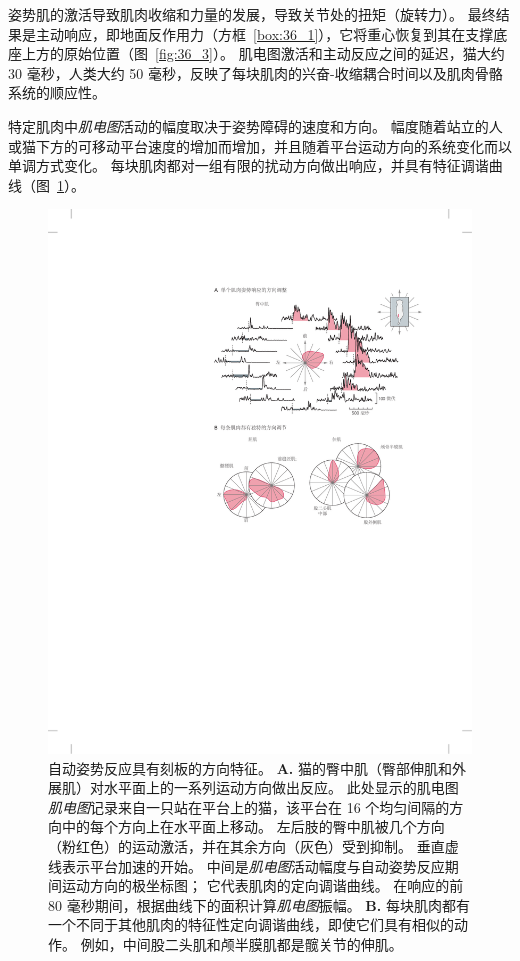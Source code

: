 姿势肌的激活导致肌肉收缩和力量的发展，导致关节处的扭矩（旋转力）。
最终结果是主动响应，即地面反作用力（方框~\ref{box:36_1}），它将重心恢复到其在支撑底座上方的原始位置（图~\ref{fig:36_3}）。
肌电图激活和主动反应之间的延迟，猫大约 30 毫秒，人类大约 50 毫秒，反映了每块肌肉的兴奋-收缩耦合时间以及肌肉骨骼系统的顺应性。


特定肌肉中\textit{肌电图}活动的幅度取决于姿势障碍的速度和方向。
幅度随着站立的人或猫下方的可移动平台速度的增加而增加，并且随着平台运动方向的系统变化而以单调方式变化。
每块肌肉都对一组有限的扰动方向做出响应，并具有特征调谐曲线（图~\ref{fig:36_4}）。



\begin{figure}[htbp]
	\centering
	\includegraphics[width=0.8\linewidth]{chap36/fig_36_4}
	\caption{自动姿势反应具有刻板的方向特征\cite{macpherson1988strategies}。
		\textbf{A.} 猫的臀中肌（臀部伸肌和外展肌）对水平面上的一系列运动方向做出反应。
		此处显示的肌电图\textit{肌电图}记录来自一只站在平台上的猫，该平台在 16 个均匀间隔的方向中的每个方向上在水平面上移动。 
		左后肢的臀中肌被几个方向（粉红色）的运动激活，并在其余方向（灰色）受到抑制。 
		垂直虚线表示平台加速的开始。 
		中间是\textit{肌电图}活动幅度与自动姿势反应期间运动方向的极坐标图；
		它代表肌肉的定向调谐曲线。
		在响应的前 80 毫秒期间，根据曲线下的面积计算\textit{肌电图}振幅。 
		\textbf{B.} 每块肌肉都有一个不同于其他肌肉的特征性定向调谐曲线，即使它们具有相似的动作。
		例如，中间股二头肌和颅半膜肌都是髋关节的伸肌。}
	\label{fig:36_4}
\end{figure}


